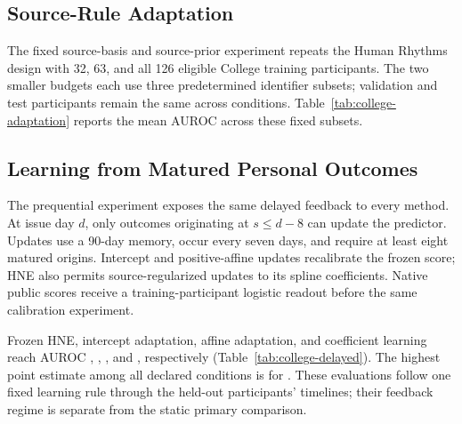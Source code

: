 \subsection{Source-Rule Adaptation}
The fixed source-basis and source-prior experiment repeats the Human Rhythms design with 32, 63, and all 126 eligible College training participants. The two smaller budgets each use three predetermined identifier subsets; validation and test participants remain the same across conditions. Table~\ref{tab:college-adaptation} reports the mean AUROC across these fixed subsets.

\begin{table}[!htb]
\centering
\caption{College transfer at fixed target-training budgets.}
\label{tab:college-adaptation}
\end{table}

\subsection{Learning from Matured Personal Outcomes}
The prequential experiment exposes the same delayed feedback to every method. At issue day $d$, only outcomes originating at $s\le d-8$ can update the predictor. Updates use a 90-day memory, occur every seven days, and require at least eight matured origins. Intercept and positive-affine updates recalibrate the frozen score; HNE also permits source-regularized updates to its spline coefficients. Native public scores receive a training-participant logistic readout before the same calibration experiment.

\begin{table}[!htb]
\centering
\caption{College prequential AUROC with matched availability of matured outcomes. Coefficient updates apply to HNE spline models.}
\label{tab:college-delayed}
\end{table}

Frozen HNE, intercept adaptation, affine adaptation, and coefficient learning reach AUROC \CollegeDelayedFrozen{}, \CollegeDelayedIntercept{}, \CollegeDelayedAffine{}, and \CollegeDelayedCoefficients{}, respectively (Table~\ref{tab:college-delayed}). The highest point estimate among all declared conditions is \CollegeDelayedBestAUC{} for \CollegeDelayedBestName{}. These evaluations follow one fixed learning rule through the held-out participants' timelines; their feedback regime is separate from the static primary comparison.


